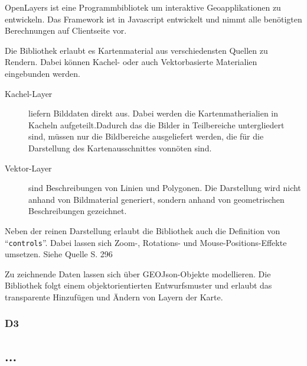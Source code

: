     
    OpenLayers ist eine Programmbibliotek um interaktive Geoapplikationen zu entwickeln. Das Framework ist in Javascript entwickelt und nimmt alle benötigten Berechnungen auf Clientseite vor.
    
    Die Bibliothek erlaubt es Kartenmaterial aus verschiedensten Quellen zu Rendern. Dabei können Kachel- oder auch Vektorbasierte Materialien eingebunden werden.
    
    \begin{description}
     \item [Kachel-Layer]  liefern Bilddaten direkt aus. Dabei werden die Kartenmatherialien in Kacheln aufgeteilt.Dadurch das die Bilder in Teilbereiche untergliedert sind, müssen nur die Bildbereiche ausgeliefert werden, die für die Darstellung des Kartenausschnittes vonnöten sind.
     
     \item [Vektor-Layer] sind Beschreibungen von Linien und Polygonen. Die Darstellung wird nicht anhand von Bildmaterial generiert, sondern anhand von geometrischen Beschreibungen gezeichnet. 
    \end{description}
    
    Neben der reinen Darstellung erlaubt die Bibliothek auch die Definition von  "`\texttt{controls}"'. Dabei lassen sich Zoom-, Rotations- und Mouse-Positions-Effekte umsetzen. Siehe Quelle \cite{openlayersbeginnersguide} S. 296
    
    Zu zeichnende Daten lassen sich über GEOJson-Objekte modellieren. Die Bibliothek folgt einem objektorientierten Entwurfsmuster und erlaubt das transparente Hinzufügen und Ändern von Layern der Karte.
    
    

    \subsubsection{D3}
    
    \subsection{...}

